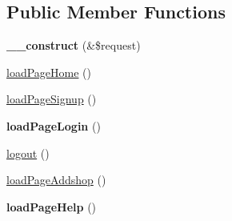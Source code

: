 \subsection*{Public Member Functions}
\begin{DoxyCompactItemize}
\item 
\hypertarget{classBasePageController_a483998015a3518d49897d271de2e3c2d}{{\bfseries \+\_\+\+\_\+construct} (\&\$request)}\label{classBasePageController_a483998015a3518d49897d271de2e3c2d}

\item 
\hyperlink{classBasePageController_a66084d1db3fcc8a5cb1f44cd82b7948a}{load\+Page\+Home} ()
\item 
\hyperlink{classBasePageController_aae6760084899d261e8f19f8dc2cbfd30}{load\+Page\+Signup} ()
\item 
\hypertarget{classBasePageController_a36cdd7c6a038c2664b333fbf8de6383a}{{\bfseries load\+Page\+Login} ()}\label{classBasePageController_a36cdd7c6a038c2664b333fbf8de6383a}

\item 
\hyperlink{classBasePageController_ad065341a301057b6b0dfc3b1e56ed56a}{logout} ()
\item 
\hyperlink{classBasePageController_aecf3ccde53aaa9b780feb5e12f2904ea}{load\+Page\+Addshop} ()
\item 
\hypertarget{classBasePageController_ae7ecc6f491f580059698d1a1a8e8d9ac}{{\bfseries load\+Page\+Help} ()}\label{classBasePageController_ae7ecc6f491f580059698d1a1a8e8d9ac}


\end{DoxyCompactItemize}
